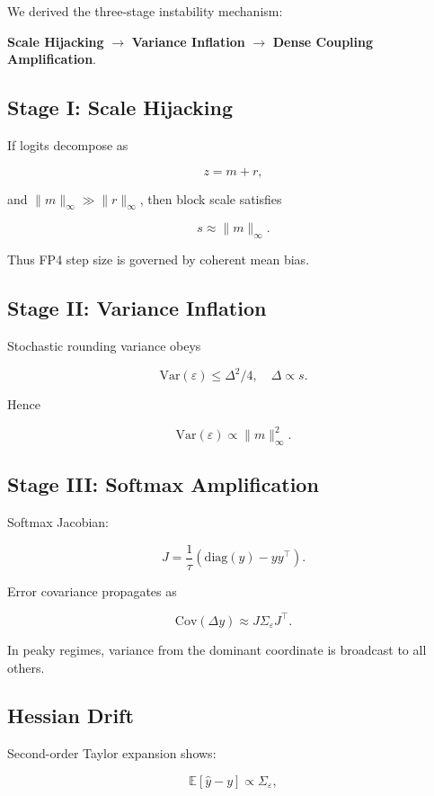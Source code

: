 We derived the three-stage instability mechanism:

\begin{center}
\textbf{Scale Hijacking} $\rightarrow$
\textbf{Variance Inflation} $\rightarrow$
\textbf{Dense Coupling Amplification}.
\end{center}

\subsection{Stage I: Scale Hijacking}

If logits decompose as

\[
z = m + r,
\]

and $\|m\|_\infty \gg \|r\|_\infty$,
then block scale satisfies

\[
s \approx \|m\|_\infty.
\]

Thus FP4 step size is governed by coherent mean bias.

\subsection{Stage II: Variance Inflation}

Stochastic rounding variance obeys

\[
\mathrm{Var}(\varepsilon) \le \Delta^2/4,
\quad \Delta \propto s.
\]

Hence

\[
\mathrm{Var}(\varepsilon) \propto \|m\|_\infty^2.
\]

\subsection{Stage III: Softmax Amplification}

Softmax Jacobian:

\[
J = \frac{1}{\tau}(\mathrm{diag}(y) - yy^\top).
\]

Error covariance propagates as

\[
\mathrm{Cov}(\Delta y) \approx J \Sigma_\varepsilon J^\top.
\]

In peaky regimes, variance from the dominant coordinate
is broadcast to all others.

\subsection{Hessian Drift}

Second-order Taylor expansion shows:

\[
\mathbb{E}[\hat y - y]
\propto \Sigma_\varepsilon,
\]


